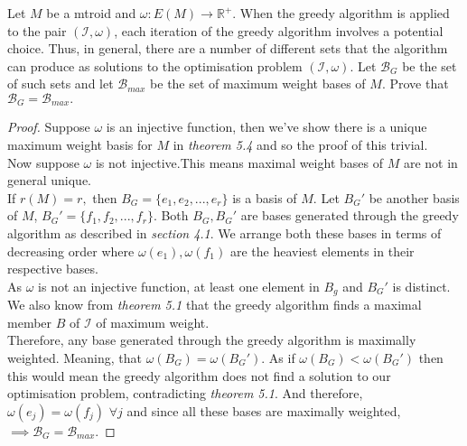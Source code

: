 \documentclass[../main.tex]{subfiles}
\begin{document}
\begin{thm}
Let $M$ be a mtroid and $\omega: E(M) \longrightarrow \mathbb{R^+}.$ When the greedy algorithm is applied to the pair $(\mathcal{I},\omega)$, each iteration of the greedy algorithm involves a potential choice. Thus, in general, there are a number of different sets that the algorithm can produce as solutions to the optimisation problem $(\mathcal{I}, \omega).$ Let $\mathcal{B}_G$ be the set of such sets and let $\mathcal{B}_{max}$ be the set of maximum weight bases of $M.$ Prove that $\mathcal{B}_G = \mathcal{B}_{max}.$
\end{thm}
\begin{proof}
Suppose $\omega$ is an injective function, then we've show there is a unique maximum weight basis for $M$ in \textit{theorem 5.4} and so the proof of this trivial.\\
Now suppose $\omega$ is not injective.This means maximal weight bases of $M$ are not in general unique.\\
If $r(M) = r,$ then $B_G = \{e_1,e_2, ..., e_r\}$ is a basis of $M.$ Let $B_G'$ be another basis of $M$, $B_G' = \{f_1, f_2, ..., f_r\}.$ Both $B_G, B_G'$ are bases generated through the greedy algorithm as described in \textit{section 4.1}.
We arrange both these bases in terms of decreasing order where $\omega(e_1), \omega(f_1)$ are the heaviest elements in their respective bases.\\
As $\omega$ is not an injective function, at least one element in $B_g$ and $B_G'$ is distinct. We also know from \textit{theorem 5.1} that the greedy algorithm finds a maximal member $B$ of $\mathcal{I}$ of maximum weight.\\
\indent Therefore, any base generated through the greedy algorithm is maximally weighted. Meaning, that $\omega(B_G) = \omega(B_G').$ As if $\omega(B_G) < \omega(B_G')$ then this would mean the greedy algorithm does not find a solution to our optimisation problem, contradicting \textit{theorem 5.1}.
And therefore, $\omega(e_j) = \omega(f_j)$ $ \forall j$ and since all these bases are maximally weighted, $\implies \mathcal{B}_G = \mathcal{B}_{max}.$
\end{proof}
\end{document}
